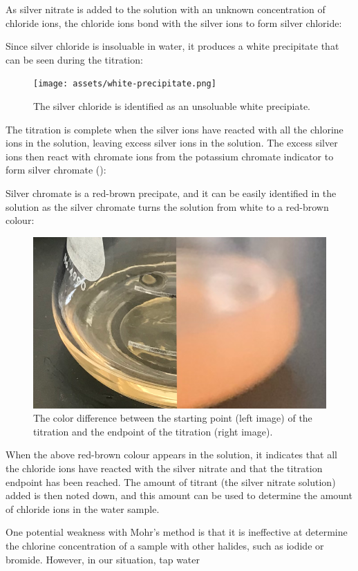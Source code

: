 \documentclass[11pt]{article}
\begin{document}
As silver nitrate is added to the solution with an unknown concentration of chloride ions, the chloride ions bond with the silver ions to form silver chloride:

\centerline{}

Since silver chloride is insoluable in water, it produces a white precipitate that can be seen during the titration:

\begin{figure}[H]
	\centering
	\texttt{[image: assets/white-precipitate.png]}
	\caption{The silver chloride is identified as an unsoluable white precipiate.}
\end{figure}

The titration is complete when the silver ions have reacted with all the chlorine ions in the solution, leaving excess silver ions in the solution. The excess silver ions then react with chromate ions from the potassium chromate indicator to form silver chromate ():

\centerline{}

Silver chromate is a red-brown precipate, and it can be easily identified in the solution as the silver chromate turns the solution from white to a red-brown colour:

\begin{figure}[H]
	\centering
	\includegraphics[width=0.3\linewidth]{assets/color-difference}
	\caption{The color difference between the starting point (left image) of the titration and the endpoint of the titration (right image).}
\end{figure}

When the above red-brown colour appears in the solution, it indicates that all the chloride ions have reacted with the silver nitrate and that the titration endpoint has been reached. The amount of titrant (the silver nitrate solution) added is then noted down, and this amount can be used to determine the amount of chloride ions in the water sample.

One potential weakness with Mohr's method is that it is ineffective at determine the chlorine concentration of a sample with other halides, such as iodide or bromide. However, in our situation, tap water %
\end{document}
